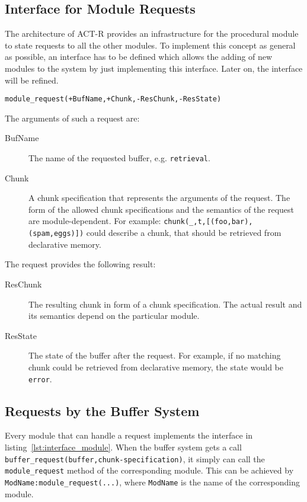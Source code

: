 \subsection{Interface for Module Requests}
\label{interface_for_module_requests}

The architecture of ACT-R provides an infrastructure for the procedural module to state requests to all the other modules. To implement this concept as general as possible, an interface has to be defined which allows the adding of new modules to the system by just implementing this interface. Later on, the interface will be refined.

\begin{lstlisting}[caption={Simple Interface \emph{IModule}},label=lst:interface_module]
module_request(+BufName,+Chunk,-ResChunk,-ResState)
\end{lstlisting}

The arguments of such a request are:

\begin{description}
 \item[BufName] The name of the requested buffer, e.g. \lstinline|retrieval|.
 \item[Chunk] A chunk specification that represents the arguments of the request. The form of the allowed chunk specifications and the semantics of the request are module-dependent. For example: \lstinline|chunk(_,t,[(foo,bar),(spam,eggs)])| could describe a chunk, that should be retrieved from declarative memory.
\end{description}

The request provides the following result:

\begin{description}
 \item[ResChunk] The resulting chunk in form of a chunk specification. The actual result and its semantics depend on the particular module.
 \item[ResState] The state of the buffer after the request. For example, if no matching chunk could be retrieved from declarative memory, the state would be \lstinline|error|.
\end{description}

\subsection{Requests by the Buffer System}
\label{how_the_buffer_system_states_a_request}

Every module that can handle a request implements the interface in listing~\ref{lst:interface_module}. When the buffer system gets a call \lstinline|buffer_request(buffer,chunk-specification)|, it simply can call the \lstinline|module_request| method of the corresponding module. This can be achieved by \lstinline|ModName:module_request(...)|, where \lstinline|ModName| is the name of the corresponding module.


